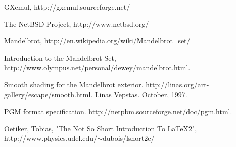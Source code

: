 \documentclass[a4paper,10pt]{article}
\begin{document}
\pagebreak

\begin{thebibliography}{99}
	
 GXemul, http://gxemul.sourceforge.net/

 The NetBSD Project, http://www.netbsd.org/

 Mandelbrot, http://en.wikipedia.org/wiki/Mandelbrot\_set/

  Introduction to the Mandelbrot Set,
http://www.olympus.net/personal/dewey/mandelbrot.html.

 Smooth shading for the Mandelbrot exterior.
http://linas.org/art-gallery/escape/smooth.html. Linas Vepstas. October, 1997.

 PGM format specification.
http://netpbm.sourceforge.net/doc/pgm.html.

 Oetiker, Tobias, "The Not So Short Introduction To LaTeX2", http://www.physics.udel.edu/$\sim$dubois/lshort2e/

\end{thebibliography}
\end{document}
